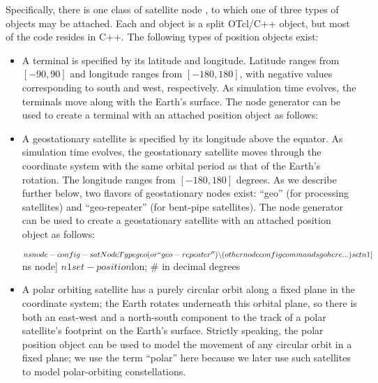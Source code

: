 Specifically, there is one class of satellite node ,
to which one of three types of  objects may be attached.  
Each  and  object is a split OTcl/C++ object,
but most of the code resides in C++.  The following types of position objects 
exist: 
\begin{itemize}
\item {} A terminal is specified by its latitude and
longitude.  Latitude ranges from $[-90, 90]$ and longitude ranges from
$[-180, 180]$, with negative values corresponding to south and west, 
respectively.  As simulation time evolves, the terminals move along
with the Earth's surface.  The  node generator can be used 
to create a terminal with an attached position object as follows:
\item {} A geostationary satellite is specified by its 
longitude above the equator.  As simulation time evolves, the geostationary
satellite moves through the coordinate system with the same orbital period
as that of the Earth's rotation.  The longitude ranges from $[-180,180]$
degrees.  As we describe further below, two flavors of geostationary nodes
exist:  ``geo'' (for processing satellites) and ``geo-repeater'' (for bent-pipe
satellites).  The node generator can be
used to create a geostationary satellite with an attached position object as 
follows:
\begin{program}
$ns node-config -satNodeType geo (or ``geo-repeater'') \bs
		(other node config commands go here...)
set n1 [$ns node]
$n1 set-position $lon; # in decimal degrees
\end{program}
\item {} A polar orbiting satellite has a purely
circular orbit along a fixed plane in the coordinate system; the Earth
rotates underneath this orbital plane, so there is both an east-west and
a north-south component to the track of a polar satellite's footprint on
the Earth's surface.  Strictly speaking, the polar position object can
be used to model the movement of any circular orbit in a fixed plane;  
we use the term ``polar'' here because we later use such satellites to model 
polar-orbiting constellations.


\end{itemize}
